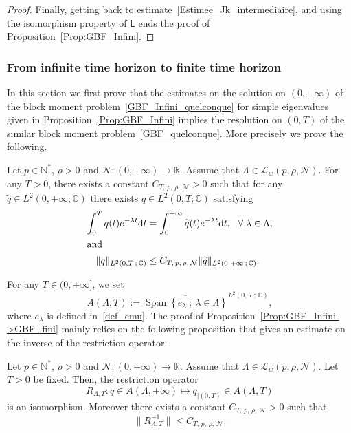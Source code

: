 \documentclass[10pt]{amsart}
\theoremstyle{definition}\newtheorem{defi}[theo]{Definition}\newtheorem{rema}[theo]{Remark}\newtheorem{exam}[theo]{Example}\newtheorem{exem}[theo]{Example}\newtheorem{nota}[theo]{Notation}
\newcommand{\LL}{\mathcal{L}}
\newcommand{\NN}{\mathcal{N}}
\newcommand{\N}{\mathbb{N}}
\newcommand{\R}{\mathbb{R}}
\newcommand{\C}{\mathbb{C}}
\newcommand{\md}{\mathrm{d}}
\DeclareMathOperator{\Span}{Span}
\let\oldforall\forall
\renewcommand*{\forall}{\mathrel{\oldforall}}
\begin{document}
\begin{proof}
Finally, getting back to estimate~\eqref{Estimee_Jk_intermediaire}, and using the isomorphism property of $\mathsf{L}$ ends the proof of Proposition~\ref{Prop:GBF_Infini}.
\end{proof}



\subsubsection{From infinite time horizon to finite time horizon}\label{Sec:BBM_finite}

In this section we first prove that the estimates on the solution on $(0,+\infty)$ of the block moment problem~\eqref{GBF_Infini_quelconque} for simple eigenvalues given in Proposition~\ref{Prop:GBF_Infini} implies the resolution on $(0,T)$ of the similar block moment problem~\eqref{GBF_quelconque}. More precisely we prove the following.

\begin{prop}\label{Prop:GBF_Infini->GBF_fini}
Let $p \in \N^*$, $ \rho > 0$ and $\NN : (0,+\infty) \to \R$. Assume that $\Lambda \in \LL_w(p,\rho, \NN)$. For any $T>0$, there exists a constant $C_{T,\,p,\,\rho,\,\NN}>0$ such that for any $\widetilde{q} \in L^2(0,+\infty ; \C)$ there exists $q \in L^2(0,T ; \C)$ satisfying
\begin{align*}
\int_0^T q(t) e^{- \lambda t} \md t &= \int_0^{+\infty} \widetilde{q}(t) e^{-\lambda t} \md t, \ \ \forall \lambda\in \Lambda,\label{GBF:Restriction_egalite}\\
\intertext{and}
\| q \|_{L^2(0,T\,;\,\C) } &\leq C_{T,\,p,\,\rho,\, \NN} \| \widetilde{q} \|_{L^2(0,+\infty\,;\, \C)}.
\end{align*}
\end{prop}
For any $T \in (0, +\infty]$, we set
\[
A(\Lambda,T) := \overline{ \Span \left\{ e_\lambda \: ; \: \lambda\in \Lambda\right\}}^{L^2(0,\,T\,;\,\C)},
\]
where $e_\lambda$ is defined in~\eqref{def_emu}. The proof of Proposition~\ref{Prop:GBF_Infini->GBF_fini} mainly relies on the following proposition that gives an estimate on the inverse of the restriction operator.

\begin{prop}\label{Prop:Restriction}
Let $p \in \N^*$, $\rho > 0$ and $\NN : (0,+\infty) \to \R$. Assume that $\Lambda \in \LL_w(p,\rho, \NN)$. Let $T>0$ be fixed. Then, the restriction operator
\begin{equation}\label{OperateurRestriction}
R_{\Lambda,T} : q \in A(\Lambda,+\infty) \mapsto q_{|(0,T)} \in A(\Lambda,T)
\end{equation}
is an isomorphism. Moreover there exists a constant $C_{T,\,p,\,\rho,\,\NN}>0$ such that
\begin{equation}\label{Estimee_Operateur_Restriction}
\| R_{\Lambda,T}^{-1} \| \leq C_{T,\,p,\,\rho,\,\NN}.
\end{equation}
\end{prop}
\end{document}
